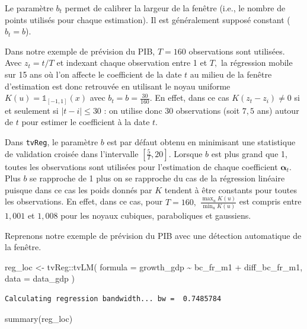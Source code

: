 \documentclass[
  a4paper,
  DIV=11,
  numbers=noendperiod,
  french]{scrartcl}
\newenvironment{Shaded}{\begin{snugshade}}{\end{snugshade}}
\newcommand{\AttributeTok}[1]{\textcolor[rgb]{0.40,0.45,0.13}{#1}}
\newcommand{\FunctionTok}[1]{\textcolor[rgb]{0.28,0.35,0.67}{#1}}
\newcommand{\NormalTok}[1]{\textcolor[rgb]{0.00,0.23,0.31}{#1}}
\newcommand{\OtherTok}[1]{\textcolor[rgb]{0.00,0.23,0.31}{#1}}
\newcommand{\SpecialCharTok}[1]{\textcolor[rgb]{0.37,0.37,0.37}{#1}}
\newcommand\1{{\mathds 1}}
\newcommand{\bf}[1]{{\boldsymbol #1}}
\theoremstyle{remark}
\begin{document}
Le paramètre \(b_t\) permet de calibrer la largeur de la fenêtre (i.e.,
le nombre de points utilisés pour chaque estimation). Il est
généralement supposé constant (\(b_t=b\)).

Dans notre exemple de prévision du PIB, \(T=160\) observations sont
utilisées. Avec \(z_t=t/T\) et indexant chaque observation entre 1 et
\(T,\) la régression mobile sur 15 ans où l'on affecte le coefficient de
la date \(t\) au milieu de la fenêtre d'estimation est donc retrouvée en
utilisant le noyau uniforme \(K(u)=\1_{[-1,1]}(x)\) avec
\(b_t=b=\frac{30}{160}.\) En effet, dans ce cas \(K(z_t-z_i)\ne0\) si et
seulement si \(|t-i|\leq30\) : on utilise donc 30 observations (soit
\(7,5\) ans) autour de \(t\) pour estimer le coefficient à la date
\(t.\)

Dans \texttt{tvReg}, le paramètre \(b\) est par défaut obtenu en
minimisant une statistique de validation croisée dans l'intervalle
\(\left[\frac{5}{T},20\right].\) Lorsque \(b\) est plus grand que 1,
toutes les observations sont utilisées pour l'estimation de chaque
coefficient \(\bf\alpha_t.\) Plus \(b\) se rapproche de 1 plus on se
rapproche du cas de la régression linéaire puisque dans ce cas les poids
donnés par \(K\) tendent à être constants pour toutes les observations.
En effet, dans ce cas, pour \(T=160,\)
\(\frac{\max_u K(u)}{\min_u K(u)}\) est compris entre \(1,001\) et
\(1,008\) pour les noyaux cubiques, paraboliques et gaussiens.

Reprenons notre exemple de prévision du PIB avec une détection
automatique de la fenêtre.

\begin{Shaded}
\begin{Highlighting}[]
\NormalTok{reg\_loc }\OtherTok{\textless{}{-}}\NormalTok{ tvReg}\SpecialCharTok{::}\FunctionTok{tvLM}\NormalTok{(}
  \AttributeTok{formula =}\NormalTok{ growth\_gdp }\SpecialCharTok{\textasciitilde{}}\NormalTok{ bc\_fr\_m1 }\SpecialCharTok{+}\NormalTok{ diff\_bc\_fr\_m1,}
  \AttributeTok{data =}\NormalTok{ data\_gdp}
\NormalTok{)}
\end{Highlighting}
\end{Shaded}

\begin{verbatim}
Calculating regression bandwidth... bw =  0.7485784 
\end{verbatim}

\begin{Shaded}
\begin{Highlighting}[]
\FunctionTok{summary}\NormalTok{(reg\_loc)}
\end{Highlighting}
\end{Shaded}
\end{document}
